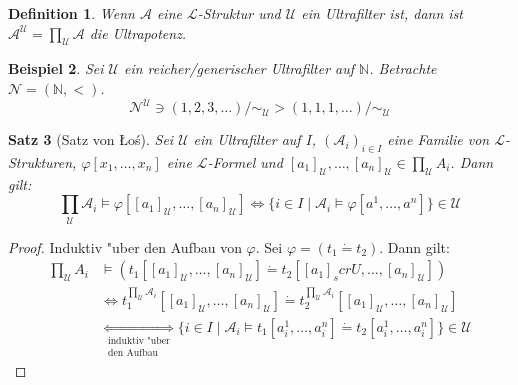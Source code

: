 \documentclass[a4paper,12pt,numbers=noenddot,parskip=full]{scrartcl}
\newcommand{\setN}{\mathbb{N}}
\newcommand{\scrL}{\mathcal{L}}
\newcommand{\scrA}{\mathcal{A}}
\newcommand{\scrU}{\mathcal{U}}
\theoremstyle{dotless}
\newtheorem{theorem}{Satz}[section]
\newtheorem{definition}[theorem]{Definition}
\newtheorem{example}[theorem]{Beispiel}
\begin{document}
	\begin{definition}
		Wenn $\scrA$ eine $\scrL$-Struktur und $\scrU$ ein Ultrafilter ist, dann ist $\scrA^\scrU = \prod\limits_{\scrU} \scrA$ die Ultrapotenz.
	\end{definition}

	\begin{example}
		Sei $\scrU$ ein reicher/generischer Ultrafilter auf $\setN$. Betrachte $\mathcal{N} = (\setN, <)$.
		\begin{equation*}
			\mathcal{N}^\scrU \ni {(1,2,3, \dots)/\sim_\scrU} > {(1,1,1, \dots)/ \sim_\scrU}
		\end{equation*}
	\end{example}

\begin{theorem}[Satz von Łoś]\label{los:thm}
	Sei $\scrU$ ein Ultrafilter auf $I$, $(\scrA_i)_{i \in I}$ eine Familie von $\scrL$-Strukturen, $\varphi[x_1, \dots, x_n]$ eine $\scrL$-Formel und $[a_1]_\scrU , \dots, [a_n]_\scrU \in \prod\limits_{\scrU} A_i$. Dann gilt:
	\begin{equation*}
		\prod\limits_{\scrU} \scrA_i \models \varphi[[a_1]_\scrU , \dots , [a_n]_\scrU] \Longleftrightarrow \{i \in I \mid \scrA_i \models \varphi[a^1, \dots, a^n] \} \in \scrU
	\end{equation*}
\end{theorem}
\begin{proof}
	Induktiv "uber den Aufbau von $\varphi$. Sei $\varphi = (t_1 \dot= t_2)$. Dann gilt:
	\begin{align*}
		\prod\limits_{\scrU} A_i &\models (t_1[[a_1]_\scrU , \dots, [a_n]_\scrU] \dot= t_2[[a_1]_scrU, \dots, [a_n]_\scrU])\\
		&\Leftrightarrow t_1^{\prod\limits_{\scrU} \scrA_i}[[a_1]_\scrU , \dots, [a_n]_\scrU] \dot= t_2^{\prod\limits_{\scrU} \scrA_i}[[a_1]_\scrU, \dots, [a_n]_\scrU]\\
		&\underset{\substack{\text{induktiv "uber}\\ \text{den Aufbau}}}{\Leftrightarrow} \{i \in I \mid \scrA_i \models t_1[a_i^1, \dots, a_i^n]\dot= t_2 [a_i^1, \dots, a_i^n] \} \in \scrU
	\end{align*}
\end{proof}
\end{document}
